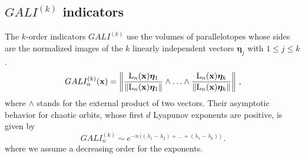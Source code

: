\subsection{$GALI^(k)$ indicators\label{subsec:other}}
%
The $k$-order indicators $GALI^{(k)}$ use the volumes of parallelotopes whose sides are the normalized images of the $k$ linearly independent vectors $\boldsymbol{\eta}_j$ with $1\le j\le k$.
%
%
\begin{equation}
  GALI^{(k)}_n ( \vb{x})= \left \Vert \frac{\mathrm{L}_n(\vb{x}) \boldsymbol{\eta}_1 }{ \Vert \mathrm{L}_n(\vb{x}) \boldsymbol{\eta}_1 \Vert}
    \wedge \ldots \wedge \frac{\mathrm{L}_n(\vb{x}) \boldsymbol{\eta}_k}{ \Vert \mathrm{L}_n(\vb{x}) \boldsymbol{\eta}_k\Vert} \right \Vert \,,
  \label{eq2_22}
\end{equation}
%
where $\wedge$ stands for the external product of two vectors. Their asymptotic behavior for chaotic orbits, whose first $d$ Lyapunov exponents are positive, is given by
\begin{equation}
    GALI^{(k)}_n \sim e^{-n\,\bigl((\lambda_1-\lambda_2) +\ldots+(\lambda_1-\lambda_k)\,\bigr)}  \,.
\end{equation}
where we assume a decreasing order for the exponents.

